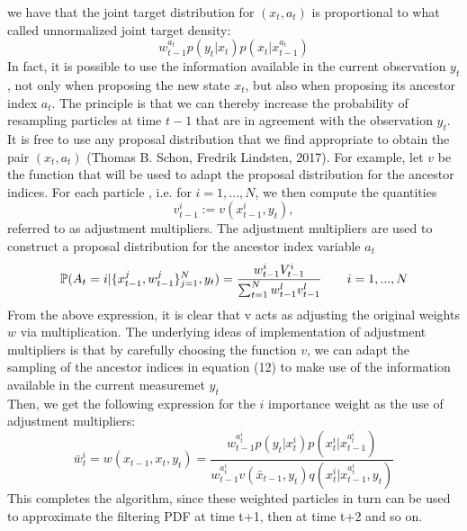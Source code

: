 \documentclass[11pt,oneside,a4paper]{article}
\begin{document}
we have that the joint target distribution for $(x_{t}, a_{t}) $ is proportional to what called unnormalized joint target density:
\begin{equation}
w_{t-1}^{a_{t}}p(y_{t}|x_{t})p(x_{t}|x_{t-1}^{a_{t}})
\end{equation}
In fact, it is possible to use the information available in the current observation $y_{t} $, not only when proposing the new state $x_{t} $, but also when proposing its ancestor index $a_{t} $. The principle is that we can thereby increase the probability of resampling particles at time $t-1 $ that are in
agreement with the observation $y_{t} $. \\
It is free to use any proposal distribution that we find appropriate to obtain the pair $(x_{t}, a_{t}) $ (Thomas B. Schon, Fredrik Lindsten, 2017). For example, let $v $ be the function that will be used to adapt the proposal distribution for the ancestor indices. For each particle
, i.e. for $i = 1,...,N $, we then compute the quantities
\begin{equation}
  v_{t-1}^{i} := v(x_{t-1}^{i}, y_{t}),
\end{equation}
referred to as adjustment multipliers. The adjustment multipliers are used to construct a proposal distribution for the ancestor index variable $a_{t} $
\begin{equation}
\mathbb{P} (A_{t} = i \arrowvert \{ x_{t-1}^{j}, w_{t-1}^{j} \}_{j=1}^{N} , y_{t} ) = \frac{w_{t-1}^{i} V_{t-1}^{i}}{\sum_{t=1}^{N} w_{t-1}^{l} v_{t-1}^{l}} \qquad i = 1,...,N
\end{equation}
From the above expression, it is clear that v acts as adjusting the original weights $w $ via multiplication. The underlying ideas of implementation of adjustment multipliers is that by carefully choosing the function $v $, we can adapt the sampling of the ancestor
indices in equation (12) to make use of the information available in the current measuremet $y_{t} $ \\
Then, we get the following expression for the $i $ importance weight as the use of adjustment multipliers:
\begin{equation}
\bar{w}_{t}^{i} = w(x_{t-1}, x_{t}, y_{t}) = \frac{w_{t-1}^{a_{t}^{i}} p(y_{t}|x_{t}^{i}) p(x_{t}^{i}|x_{t-1}^{a_{t}^{i}})}{w_{t-1}^{a_{t}^{i}} v(\bar{x}_{t-1}, y_{t}) q(x_{t}^{i}|x_{t-1}^{a_{t}^{i}}, y_{t})}
\end{equation}
This completes the algorithm, since these weighted particles in turn can be used to approximate the filtering PDF at
time t+1, then at time t+2 and so on.
\end{document}
